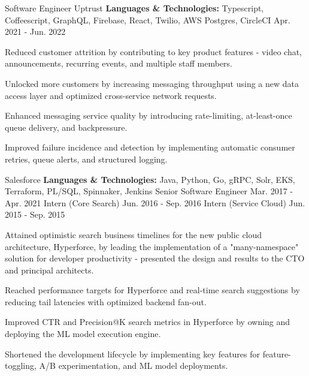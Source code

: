 
\begin{cventries}

  \cventry
    {Software Engineer}
    {Uptrust}
    {\textbf{Languages \& Technologies:} Typescript, Coffeescript, GraphQL, Firebase, React, Twilio, AWS Postgres, CircleCI}
    {Apr. 2021 - Jun. 2022}
    {
      \begin{cvitems}
        \item {Reduced customer attrition by contributing to key product features - video chat, announcements, recurring events, and multiple staff members.}
        \item {Unlocked more customers by increasing messaging throughput using a new data access layer and optimized cross-service network requests.}
        \item {Enhanced messaging service quality by introducing rate-limiting, at-least-once queue delivery, and backpressure.}
        \item {Improved failure incidence and detection by implementing automatic consumer retries, queue alerts, and structured logging.}
      \end{cvitems}
    }

  \cvthreeentry
    {Salesforce}
    {\textbf{Languages \& Technologies:} Java, Python, Go, gRPC, Solr, EKS, Terraform, PL/SQL, Spinnaker, Jenkins}
    {Senior Software Engineer}
    {Mar. 2017 - Apr. 2021}
    {Intern (Core Search)}
    {Jun. 2016 - Sep. 2016}
    {Intern (Service Cloud)}
    {Jun. 2015 - Sep. 2015}
    {
      \begin{cvitems}
        \item {Attained optimistic search business timelines for the new public cloud architecture, Hyperforce, by leading the implementation of a "many-namespace" solution for developer productivity - presented the design and results to the CTO and principal architects.}
        \item {Reached performance targets for Hyperforce and real-time search suggestions by reducing tail latencies with optimized backend fan-out.}
        \item {Improved CTR and Precision@K search metrics in Hyperforce by owning and deploying the ML model execution engine.}
        \item {Shortened the development lifecycle by implementing key features for feature-toggling, A/B experimentation, and ML model deployments.}
      \end{cvitems}
    }


\end{cventries}
